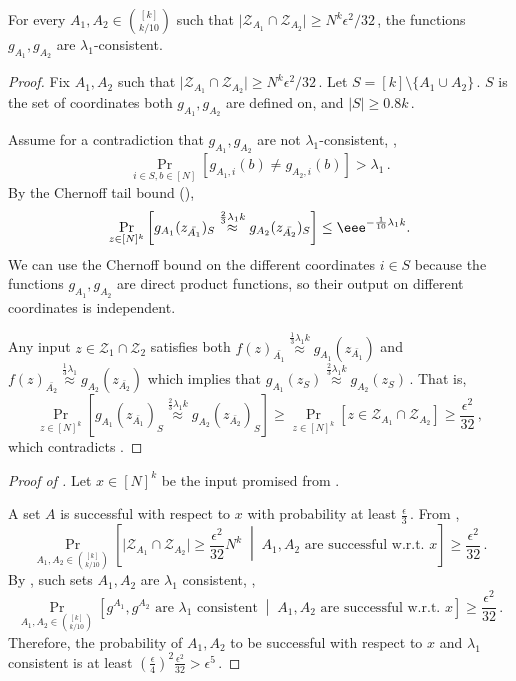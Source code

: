 \documentclass{toc}
\newcommand{\Prob}[2][]{\Pr_{{#1}}\left[#2\right]} %
\newcommand{\Paren}[1]{\left(#1\right)} %
\newcommand{\abs}[1]{\lvert#1\rvert} %
\newcommand{\given}{\;\middle\vert\;} %
\newcommand{\set}[1]{\{#1\}} %
\newcommand\f{f} %
\newcommand{\g}{g} %
\newcommand\neql[1]{\stackrel{{#1}}{ \approx}} %
\newcommand\rest[1]{{\bar{#1}}}  %
\newcommand\zi{\mathcal{Z}} %
\begin{document}
\begin{claim}\label{claim: consistent sets}
	For every $A_1,A_2\in\binom{[k]}{k/10}$ such that $\abs{\zi_{A_1}\cap\zi_{A_2}} \geq 
N^k\epsilon^2/32$\,, %
 the functions $\g_{A_1},\g_{A_2}$ are $\lambda_1$-consistent.
\end{claim}
\begin{proof}
	Fix $A_1,A_2$ such that $\abs{\zi_{A_1}\cap\zi_{A_2}} \geq 
N^k\epsilon^2/32$\,. %
 Let $S = [k]\setminus\set{A_1\cup A_2}$\,. $S$ is the set of coordinates both $\g_{A_1},\g_{A_2}$ are defined on, and $\abs{S}\geq 0.8k$\,.
	
Assume  %
for  %
a contradiction that $\g_{A_1},\g_{A_2}$ are not $\lambda_1$-consistent, \ie, %
\[\Prob[{i\in S,b\in [N]}]{g_{A_1,i}(b)\neq g_{A_2,i}(b)} > \lambda_1\,.\]
By %
the  %
Chernoff tail bound  %
(),  %
	\begin{align}\label{eq:inconsistent g_A} \Prob[{z\in [N]^k}]{\g_{A_1}(z_{\rest{A_1}})_S\neql{\frac{2}{3}\lambda_1 k}\g_{A_2}(z_{\rest{A_2}})_S}  
	\leq \eee^{-\frac{1}{10}\lambda_1 k}. \end{align}
We can use %
the  %
Chernoff bound on the different coordinates $i\in S$ because the functions $\g_{A_1},\g_{A_2}$ are direct product functions, so their output on different coordinates is independent.
	
	Any input $z\in \zi_{1}\cap \zi_2$ satisfies both $\f(z)_{\rest{A_1}}\neql{\frac{1}{3}\lambda_1 k}\g_{A_1}(z_{\rest{A_1}})$ and $\f(z)_{\rest{A_2}}\neql{\frac{1}{3}\lambda_1}\g_{A_2}(z_{\rest{A_2}})$ which implies that $\g_{A_1}(z_S)\neql{\frac{2}{3}\lambda_1 k}\g_{A_2}(z_S) $\,. That is, 
	\[ \Prob[{z\in [N]^k}]{\g_{A_1}(z_{\rest{A_1}})_S\neql{\frac{2}{3}\lambda_1 k}\g_{A_2}(z_{\rest{A_2}})_S} \geq \Prob[{z\in [N]^k}]{z\in \zi_{A_1}\cap \zi_{A_2}}\geq \frac{\epsilon^2}{32} \,,\] %
		which contradicts .
\end{proof}

\begin{proof}[Proof of ]
	Let $x\in[N]^k$ be the input promised from . 
	
	
    A set $A$ is successful with respect to $x$ with probability at least $\frac{\epsilon}{3}$\,. 
	From ,
	\[\Prob[A_1,A_2\in\binom{[k]}{k/10}]{\abs{\zi_{A_1}\cap\zi_{A_2}}\geq \frac{\epsilon^2}{32}N^k\given A_1,A_2 \textrm{ are successful w.r.t. }x } \geq \frac{\epsilon^2}{32}\,.\]
	By , such sets $A_1,A_2$ are $\lambda_1$ consistent, \ie,
	\[\Prob[A_1,A_2\in\binom{[k]}{k/10}]{\g^{A_1},\g^{A_2} \textrm{ are } \lambda_1 \textrm{ consistent}\given A_1,A_2 \textrm{ are successful w.r.t. }x } \geq \frac{\epsilon^2}{32} \,.\] %
	Therefore, the probability of $A_1,A_2$ to be successful with respect to $x$ and $\lambda_1$ consistent is at least $\Paren{\frac{\epsilon}{4}}^2\frac{\epsilon^2}{32} > \epsilon^5$\,.
\end{proof}
\end{document}
